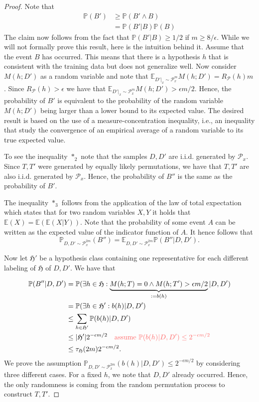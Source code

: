 \begin{proof}
Note that 
\begin{align*}
	\mathbb{P}(B') &\geq \mathbb{P}(B' \wedge B) \\
	&= \mathbb{P}(B'|B) \mathbb{P}(B)	
\end{align*}
The claim now follows from the fact that $\mathbb{P}(B'|B) \geq 1/2$ if $m \geq 8/\epsilon$. While we
will not formally prove this result, here is the intuition behind it. Assume
that the event $B$ has occurred. This means that there is a hypothesis $h$ that
is consistent with the training data but does not generalize well. Now consider
$M(h;D')$ as a random variable and note that $\mathbb{E}_{D'|_x \sim
\mathcal{P}^m_x} M(h;D') = R_\mathcal{P}(h) m$. Since $R_\mathcal{P}(h) >
\epsilon$ we have that $\mathbb{E}_{D'|_x \sim \mathcal{P}^m_x} M(h;D') >
\epsilon m/2$. Hence, the probability of $B'$ is equivalent to the probability of
the random variable $M(h;D')$ being larger than a lower bound to its expected
value. The desired result is based on the use of a measure-concentration
inequality, i.e., an inequality that study the convergence of an
empirical
average of a random variable to its true expected value.

To see the inequality $*_2$ note that the samples $D, D'$ are i.i.d. generated
by $\mathcal{P}_x$. Since $T,T'$ were generated by equally likely permutations,
we have that $T,T'$ are also i.i.d. generated by $\mathcal{P}_x$. Hence, the
probability of $B''$ is the same as the probability of $B'$.

The inequality $*_3$ follows from the application of the law of total
expectation which states that for two random variables $X,Y$ it holds that
$\mathbb{E}(X) = \mathbb{E}(\mathbb{E}(X|Y))$. Note that the probability of some
event $A$ can be written as the expected value of the indicator function of $A$.
It hence follows that 
$$
\mathbb{P}_{D, D' \sim \mathcal{P}_x^{2m}}(B'') = \mathbb{E}_{D, D' \sim \mathcal{P}_x^{2m}} \mathbb{P}(B''|D,D').
$$ 

Now let $\mathfrak{H}'$ be a hypothesis class containing one representative for
each different labeling of $\mathfrak{H}$ of $D, D'$. 
We have that 

\begin{align*}
\mathbb{P}(B''|D, D') & = \mathbb{P}(\exists h \in \mathfrak{H}: \underbrace{M(h;T) = 0 \wedge M(h;T') > \epsilon m/2}_{:=b(h)}|D, D')\\ 
&= \mathbb{P}(\exists h \in \mathfrak{H}': b(h)|D, D')\\
&\leq \sum_{h \in \mathfrak{H}'} \mathbb{P}(b(h)|D, D')\\
&\leq |\mathfrak{H}'| 2^{-\epsilon m/2}\quad \text{\color{mildred} assume }{\color{mildred} \mathbb{P}(b(h)|D, D') \leq 2^{-\epsilon m/2}}\\
&\leq \tau_\mathfrak{H}(2m) 2^{-\epsilon m/2}.
\end{align*}
We prove the assumption $\mathbb{P}_{D, D' \sim \mathcal{P}_x^{2m}}(b(h)|D, D') \leq 2^{-\epsilon m/2}$ by
considering three different cases. For a fixed $h$, we note that $D, D'$ already
occurred. Hence, the only randomness is coming from the random permutation
process to construct $T, T'$.


\end{proof}
